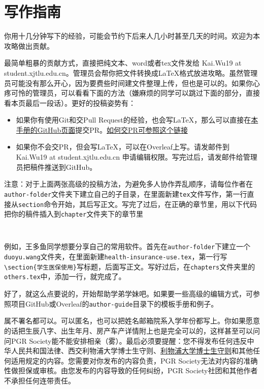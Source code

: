 \chapter{写作指南}
\label{chapter.author-ins}


你用十几分钟写下的经验，可能会节约下后来人几小时甚至几天的时间。欢迎为本攻略做出贡献。

最简单粗暴的贡献方式，直接把纯文本、word或者tex文件发给 Kai.Wu19 at student.xjtlu.edu.cn。管理员会帮你把文件转换成\LaTeX{}格式放进攻略。虽然管理员可能没有那么开心，因为要费些时间建文件整理上传，但也是可以的。如果你心疼可怜的管理员，可以看看下面的方法（嫌麻烦的同学可以跳过下面的部分，直接看本页最后一段话）。更好的投稿姿势有：


\begin{itemize}
    \item 如果你有使用Git和交Pull Request的经验，也会写\LaTeX{}，那么可以直接在\href{https://github.com/kaiwu-astro/xp_pgrs_unofficial_guide}{本手册的GitHub页面}提交PR。\href{https://www.zhihu.com/question/21682976/answer/79489643}{如何交PR可参照这个链接}
    \item 如果你不会交PR，但会写\LaTeX{}，可以在Overleaf上写。请发邮件到 Kai.Wu19 at student.xjtlu.edu.cn 申请编辑权限。写完过后，请发邮件给管理员把稿件推送到GitHub。
\end{itemize} 

\vspace{5mm}
注意：对于上面两张高级的投稿方法，为避免多人协作弄乱顺序，请每位作者在\texttt{author-folder}文件夹下建立自己的子目录，在里面新建\texttt{tex}文件写作，第一行直接从\texttt{section}命令开始，其后写正文。写完了过后，在正确的章节里，用以下代码把你的稿件插入到\texttt{chapter}文件夹下的章节里
\begin{lstlisting}
    
\end{lstlisting} 
例如，王多鱼同学想要分享自己的常用软件。首先在\texttt{author-folder}下建立一个\texttt{duoyu.wang}文件夹，在里面新建\texttt{health-insurance-use.tex}，第一行写\lstinline[breaklines=true]!\section{学生医保使用}!写标题，后面写正文。写好过后，在\texttt{chapters}文件夹里的\texttt{others.tex}中，添加一行\lstinline[breaklines=true]!!，就完成了。

\vspace{5mm}
好了，就这么点要说的，开始帮助学弟学妹吧。如果要一些高级的编辑方式，可参照项目GitHub或Overleaf的\texttt{author-guide}目录下的模板手册和例子。

\vspace{5mm}
属不署名都可以。可以匿名，也可以把姓名邮箱院系入学年份都写上。你如果愿意的话把生辰八字、出生年月、房产车产详情附上也是完全可以的，这样甚至可以问问PGR Society能不能安排相亲（雾）。最后必须要提醒：您不得发布任何违反中华人民共和国法律、西交利物浦大学博士生守则、\href{https://www.liverpool.ac.uk/aqsd/academic-codes-of-practice/pgr-code-of-practice/}{利物浦大学博士生守则}和其他任何适用规定的内容。您需要对你发布的内容负责，PGR Society无法对内容的准确性做担保或审核。由您发布的内容导致的任何纠纷，PGR Society社团和其他作者不承担任何连带责任。